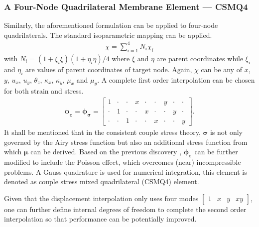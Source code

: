 \documentclass[3p,sort&compress,11pt,fleqn]{elsarticle}
\begin{document}
\subsubsection{A Four-Node Quadrilateral Membrane Element --- CSMQ4}
Similarly, the aforementioned formulation can be applied to four-node quadrilaterals. The standard isoparametric mapping can be applied.
\begin{gather}
\chi=\sum_{i=1}^4N_i\chi_i
\end{gather}
with $N_i=\left(1+\xi_i\xi\right)\left(1+\eta_i\eta\right)/4$ where $\xi$ and $\eta$ are parent coordinates while $\xi_i$ and $\eta_i$ are values of parent coordinates of target node. Again, $\chi$ can be any of $x$, $y$, $u_x$, $u_y$, $\theta_z$, $\kappa_x$, $\kappa_y$, $\mu_x$ and $\mu_y$. A complete first order interpolation can be chosen for both strain and stress.
\begin{gather}
\mathbold{\phi}_\mathbold{\varepsilon}=\mathbold{\phi}_\mathbold{\sigma}=\begin{bmatrix}
1&\cdot&\cdot&x&\cdot&\cdot&y&\cdot&\cdot\\
\cdot&1&\cdot&\cdot&x&\cdot&\cdot&y&\cdot\\
\cdot&\cdot&1&\cdot&\cdot&x&\cdot&\cdot&y
\end{bmatrix}.
\end{gather}
It shall be mentioned that in the consistent couple stress theory, $\mathbold{\sigma}$ is not only governed by the Airy stress function but also an additional stress function \citep{Hadjesfandiari2011} from which $\mathbold{\mu}$ can be derived. Based on the previous discovery \citep{Chang2019}, $\mathbold{\phi}_\mathbold{\varepsilon}$ can be further modified to include the Poisson effect, which overcomes (near) incompressible problems. A  Gauss quadrature is used for numerical integration, this element is denoted as couple stress mixed quadrilateral (CSMQ4) element.

Given that the displacement interpolation only uses four modes $\begin{bmatrix}
1&x&y&xy
\end{bmatrix}$, one can further define internal degrees of freedom to complete the second order interpolation so that performance can be potentially improved.
\end{document}
